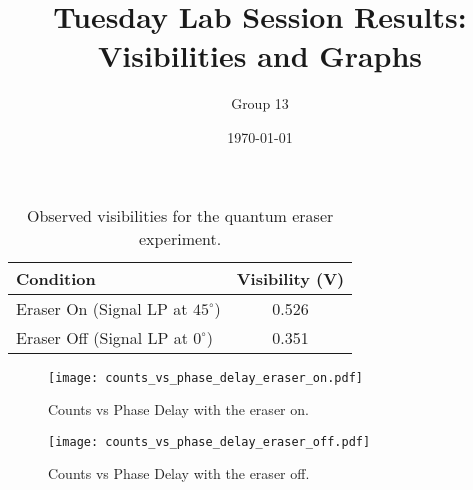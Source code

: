 \documentclass{article}
\title{Tuesday Lab Session Results: Visibilities and Graphs}
\author{Group 13} %
\date{\today}
\begin{document}
\pagestyle{empty} %

\begin{table}[h!]
\centering
\begin{tabular}{lc}
\toprule
\textbf{Condition} & \textbf{Visibility (V)} \\
\midrule
Eraser On (Signal LP at $45^\circ$)          & 0.526 \\
Eraser Off (Signal LP at $0^\circ$) & 0.351 \\
\bottomrule
\end{tabular}
\caption{Observed visibilities for the quantum eraser experiment.}
\end{table}


\begin{figure}[h!]
\centering
\texttt{[image: counts\_vs\_phase\_delay\_eraser\_on.pdf]}
\caption{Counts vs Phase Delay with the eraser on.}
\label{fig:eraser_on}
\end{figure}


\begin{figure}[h!]
\centering
\texttt{[image: counts\_vs\_phase\_delay\_eraser\_off.pdf]}
\caption{Counts vs Phase Delay with the eraser off.}
\label{fig:eraser_off}
\end{figure}
\end{document}
